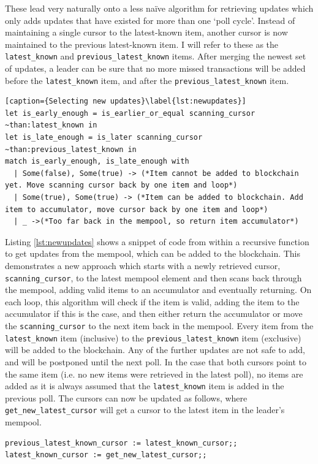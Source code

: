 \documentclass[12pt,a4paper,twoside,openright]{report}
\begin{document}
			These lead very naturally onto a less na{\"i}ve algorithm for retrieving updates which only adds updates that have existed for more than one `poll cycle'.
			Instead of maintaining a single cursor to the latest-known item, another cursor is now maintained to the previous latest-known item. 
			I will refer to these as the \texttt{latest\_known} and \texttt{previous\_latest\_known} items.
			After merging the newest set of updates, a leader can be sure that no more missed transactions will be added before the \texttt{latest\_known} item, and after the \texttt{previous\_latest\_known} item. 
			\begin{lstlisting}[caption={Selecting new updates}\label{lst:newupdates}]
let is_early_enough = is_earlier_or_equal scanning_cursor ~than:latest_known in
let is_late_enough = is_later scanning_cursor ~than:previous_latest_known in
match is_early_enough, is_late_enough with
  | Some(false), Some(true) -> (*Item cannot be added to blockchain yet. Move scanning cursor back by one item and loop*)
  | Some(true), Some(true) -> (*Item can be added to blockchain. Add item to accumulator, move cursor back by one item and loop*)
  | _ ->(*Too far back in the mempool, so return item accumulator*)
			\end{lstlisting}

			Listing \ref{lst:newupdates} shows a snippet of code from within a recursive function to get updates from the mempool, which can be added to the blockchain.
			This demonstrates a new approach which starts with a newly retrieved cursor, \texttt{scanning\_cursor}, to the latest mempool element and then scans back through the mempool, adding valid items to an accumulator and eventually returning.
			On each loop, this algorithm will check if the item is valid, adding the item to the accumulator if this is the case, and then either return the accumulator or move the \texttt{scanning\_cursor} to the next item back in the mempool.
			Every item from the \texttt{latest\_known} item (inclusive) to the \texttt{previous\_latest\_known} item (exclusive) will be added to the blockchain. 
			Any of the further updates are not safe to add, and will be postponed until the next poll.
			In the case that both cursors point to the same item (i.e. no new items were retrieved in the latest poll), no items are added as it is always assumed that the \texttt{latest\_known} item is added in the previous poll.
			The cursors can now be updated as follows, where \texttt{get\_new\_latest\_cursor} will get a cursor to the latest item in the leader's mempool.
			\begin{lstlisting}
previous_latest_known_cursor := latest_known_cursor;;
latest_known_cursor := get_new_latest_cursor;;
			\end{lstlisting}
			
\end{document}
